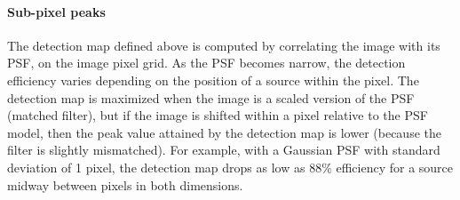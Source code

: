 \documentclass[letterpaper,preprint]{aastex62}
\newcommand{\doctype}{paper}
\begin{document}













\paragraph{Sub-pixel peaks}  The detection map defined above
is computed by correlating the image with its PSF, on the image pixel
grid.  As the PSF becomes narrow, the detection efficiency varies
depending on the position of a source within the pixel.  The detection
map is maximized when the image is a scaled version of the PSF
(matched filter), but if the image is shifted within a pixel relative
to the PSF model, then the peak value attained by the detection map is
lower (because the filter is slightly mismatched).  For example, with
a Gaussian PSF with standard deviation of 1 pixel, the detection map
drops as low as 88\% efficiency for a source midway between pixels in
both dimensions.
\end{document}
